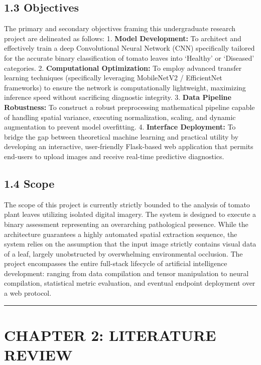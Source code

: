 \documentclass[
]{article}
\begin{document}
\subsection{1.3 Objectives}\label{objectives}

The primary and secondary objectives framing this undergraduate research
project are delineated as follows: 1. \textbf{Model Development:} To
architect and effectively train a deep Convolutional Neural Network
(CNN) specifically tailored for the accurate binary classification of
tomato leaves into `Healthy' or `Diseased' categories. 2.
\textbf{Computational Optimization:} To employ advanced transfer
learning techniques (specifically leveraging MobileNetV2 / EfficientNet
frameworks) to ensure the network is computationally lightweight,
maximizing inference speed without sacrificing diagnostic integrity. 3.
\textbf{Data Pipeline Robustness:} To construct a robust preprocessing
mathematical pipeline capable of handling spatial variance, executing
normalization, scaling, and dynamic augmentation to prevent model
overfitting. 4. \textbf{Interface Deployment:} To bridge the gap between
theoretical machine learning and practical utility by developing an
interactive, user-friendly Flask-based web application that permits
end-users to upload images and receive real-time predictive diagnostics.

\subsection{1.4 Scope}\label{scope}

The scope of this project is currently strictly bounded to the analysis
of tomato plant leaves utilizing isolated digital imagery. The system is
designed to execute a binary assessment representing an overarching
pathological presence. While the architecture guarantees a highly
automated spatial extraction sequence, the system relies on the
assumption that the input image strictly contains visual data of a leaf,
largely unobstructed by overwhelming environmental occlusion. The
project encompasses the entire full-stack lifecycle of artificial
intelligence development: ranging from data compilation and tensor
manipulation to neural compilation, statistical metric evaluation, and
eventual endpoint deployment over a web protocol.

\begin{center}\rule{0.5\linewidth}{0.5pt}\end{center}

\section{CHAPTER 2: LITERATURE
REVIEW}\label{chapter-2-literature-review}
\end{document}
